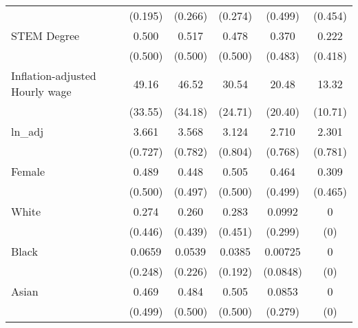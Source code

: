 \begin{table}[htbp]
\begin{tabular}{l*{5}{c}}
                    &     (0.195)         &     (0.266)         &     (0.274)         &     (0.499)         &     (0.454)         \\
[1em]
STEM Degree         &       0.500         &       0.517         &       0.478         &       0.370         &       0.222         \\
                    &     (0.500)         &     (0.500)         &     (0.500)         &     (0.483)         &     (0.418)         \\
[1em]
Inflation-adjusted Hourly wage&       49.16         &       46.52         &       30.54         &       20.48         &       13.32         \\
                    &     (33.55)         &     (34.18)         &     (24.71)         &     (20.40)         &     (10.71)         \\
[1em]
ln\_adj              &       3.661         &       3.568         &       3.124         &       2.710         &       2.301         \\
                    &     (0.727)         &     (0.782)         &     (0.804)         &     (0.768)         &     (0.781)         \\
[1em]
Female              &       0.489         &       0.448         &       0.505         &       0.464         &       0.309         \\
                    &     (0.500)         &     (0.497)         &     (0.500)         &     (0.499)         &     (0.465)         \\
[1em]
White               &       0.274         &       0.260         &       0.283         &      0.0992         &           0         \\
                    &     (0.446)         &     (0.439)         &     (0.451)         &     (0.299)         &         (0)         \\
[1em]
Black               &      0.0659         &      0.0539         &      0.0385         &     0.00725         &           0         \\
                    &     (0.248)         &     (0.226)         &     (0.192)         &    (0.0848)         &         (0)         \\
[1em]
Asian               &       0.469         &       0.484         &       0.505         &      0.0853         &           0         \\
                    &     (0.499)         &     (0.500)         &     (0.500)         &     (0.279)         &         (0)         \\

\end{tabular}
\end{table}
